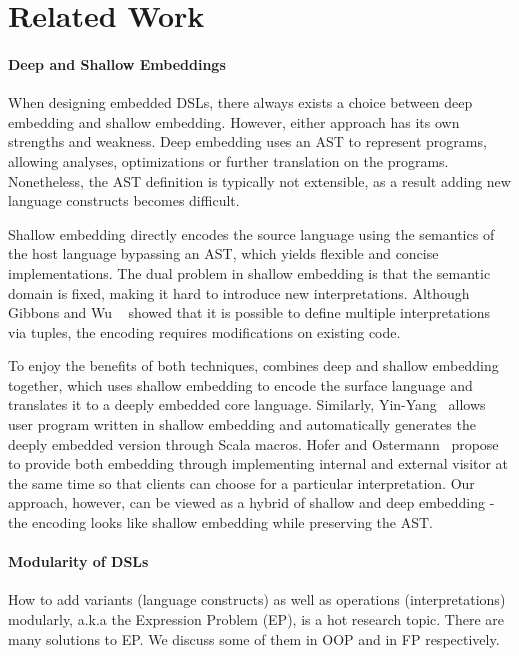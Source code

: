 \section{Related Work}

\paragraph{Deep and Shallow Embeddings}
When designing embedded DSLs, there always exists a choice between deep
embedding and shallow embedding.
However, either approach has its own strengths and weakness.
Deep embedding uses an AST to represent programs, allowing
analyses, optimizations or further translation on the programs.
Nonetheless, the AST definition is typically not extensible, as a result
adding new language constructs becomes difficult.

Shallow embedding directly encodes the source language using the semantics of
the host language bypassing an AST, which yields flexible and concise implementations.
The dual problem in shallow embedding is that the semantic domain is fixed,
making it hard to introduce new interpretations.
Although Gibbons and Wu ~\cite{gibbons} showed that it is possible to define multiple
interpretations via tuples, the encoding requires modifications on existing code.

To enjoy the benefits of both techniques, \cite{svenningsson2012combining}
combines deep and shallow embedding together, which uses shallow embedding to
encode the surface language and translates it to a deeply embedded core language.
Similarly, Yin-Yang~\cite{Jovanovic:2014:YCD:2658761.2658771} allows user
program written in shallow embedding and automatically generates the deeply
embedded version through Scala macros. Hofer and Ostermann~\cite{hofer2010modular} propose to provide both embedding through implementing internal and external visitor at
the same time so that clients can choose for a
particular interpretation.
Our approach, however, can be viewed as a hybrid of shallow and deep embedding -
the encoding looks like shallow embedding while preserving the AST.



\paragraph{Modularity of DSLs}
How to add variants (language constructs) as well as operations
(interpretations) modularly, a.k.a the Expression Problem (EP), is a hot research
topic. There are many solutions to EP. We discuss some of them in
OOP and in FP respectively.

